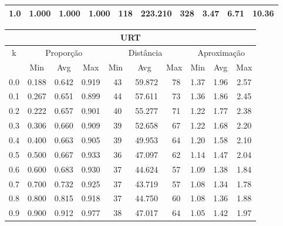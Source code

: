 \begin{table}[!p]
\begin{center}
{\begin{tabular}{|c|c|c|c|c|c|c|c|c|c|}
1.0                & 1.000     & 1.000    & 1.000    & 118      & 223.210  & 328     & 3.47    & 6.71  & 10.36            \\ \hline
\end{tabular}%
\vspace{5pt}
\begin{tabular}{|c|c|c|c|c|c|c|c|c|c|}
\hline
\multicolumn{10}{|c|}{\bf URT}                                                                                            \\ \hline
\multirow{2}{*}{k} & \multicolumn{3}{c|}{Proporção}  & \multicolumn{3}{c|}{Distância} & \multicolumn{3}{c|}{Aproximação}  \\ \cline{2-10}
                   & Min       & Avg      & Max      & Min      & Avg      & Max     & Min     & Avg   & Max              \\ \hline
0.0                & 0.188     & 0.642    & 0.919    & ~43      & ~59.872  & ~78     & 1.37    & 1.96  & 2.57             \\ \hline
0.1                & 0.267     & 0.651    & 0.899    & ~44      & ~57.611  & ~73     & 1.36    & 1.86  & 2.45             \\ \hline
0.2                & 0.222     & 0.657    & 0.901    & ~40      & ~55.277  & ~71     & 1.22    & 1.77  & 2.38             \\ \hline
0.3                & 0.306     & 0.660    & 0.909    & ~39      & ~52.658  & ~67     & 1.22    & 1.68  & 2.20             \\ \hline
0.4                & 0.400     & 0.663    & 0.905    & ~39      & ~49.953  & ~64     & 1.20    & 1.58  & 2.10             \\ \hline
0.5                & 0.500     & 0.667    & 0.933    & ~36      & ~47.097  & ~62     & 1.14    & 1.47  & 2.04             \\ \hline
0.6                & 0.600     & 0.683    & 0.930    & ~37      & ~44.624  & ~57     & 1.09    & 1.38  & 1.84             \\ \hline
0.7                & 0.700     & 0.732    & 0.925    & ~37      & ~43.719  & ~57     & 1.08    & 1.34  & 1.78             \\ \hline
0.8                & 0.800     & 0.815    & 0.918    & ~37      & ~44.750  & ~60     & 1.08    & 1.36  & 1.88             \\ \hline
0.9                & 0.900     & 0.912    & 0.977    & ~38      & ~47.017  & ~64     & 1.05    & 1.42  & 1.97             \\ \hline

\end{tabular}}
\end{center}
\end{table}
